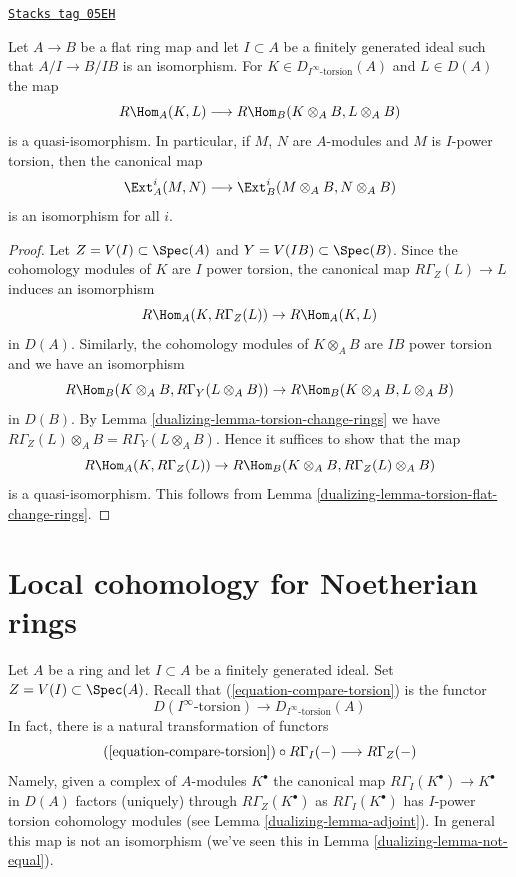 \begin{lemma}
\label{dualizing-lemma-neighbourhood-extensions}
\href{https://stacks.math.columbia.edu/tag/05EH}{\texttt{Stacks tag 05EH}}

Let $A \to B$ be a flat ring map and let $I \subset A$ be a
finitely generated ideal such that $A/I \to B/IB$ is an isomorphism.
For $K \in D_{I^\infty\text{-torsion}}(A)$ and $L \in D(A)$
the map
$$
R\Hom_A(K, L) \longrightarrow R\Hom_B(K \otimes_A B, L \otimes_A B)
$$
is a quasi-isomorphism. In particular, if $M$, $N$ are $A$-modules and
$M$ is $I$-power torsion, then the canonical map
$$
\Ext^i_A(M, N)
\longrightarrow
\Ext^i_B(M \otimes_A B, N \otimes_A B)
$$
is an isomorphism for all $i$.
\end{lemma}

\begin{proof}

Let $Z = V(I) \subset \Spec(A)$ and $Y = V(IB) \subset \Spec(B)$.
Since the cohomology modules of $K$ are $I$ power torsion, the
canonical map $R\Gamma_Z(L) \to L$ induces an isomorphism
$$
R\Hom_A(K, R\Gamma_Z(L)) \to R\Hom_A(K, L)
$$
in $D(A)$. Similarly, the cohomology modules of $K \otimes_A B$ are
$IB$ power torsion and we have an isomorphism
$$
R\Hom_B(K \otimes_A B, R\Gamma_Y(L \otimes_A B)) \to
R\Hom_B(K \otimes_A B, L \otimes_A B)
$$
in $D(B)$.
By Lemma \ref{dualizing-lemma-torsion-change-rings} we have
$R\Gamma_Z(L) \otimes_A B = R\Gamma_Y(L \otimes_A B)$.
Hence it suffices to show that the map
$$
R\Hom_A(K, R\Gamma_Z(L)) \to R\Hom_B(K \otimes_A B, R\Gamma_Z(L) \otimes_A B)
$$
is a quasi-isomorphism. This follows from
Lemma \ref{dualizing-lemma-torsion-flat-change-rings}.
\end{proof}

\section{Local cohomology for Noetherian rings}
\label{dualizing-section-local-cohomology-noetherian}
Let $A$ be a ring and let $I \subset A$ be a finitely generated ideal.
Set $Z = V(I) \subset \Spec(A)$. Recall that (\ref{equation-compare-torsion})
is the functor
$$
D(I^\infty\text{-torsion}) \to D_{I^\infty\text{-torsion}}(A)
$$
In fact, there is a natural transformation of functors
\begin{equation}
\label{equation-compare-torsion-functors}
(\ref{equation-compare-torsion}) \circ R\Gamma_I(-)
\longrightarrow
R\Gamma_Z(-)
\end{equation}
Namely, given a complex of $A$-modules $K^\bullet$ the canonical map
$R\Gamma_I(K^\bullet) \to K^\bullet$ in $D(A)$ factors (uniquely)
through $R\Gamma_Z(K^\bullet)$ as $R\Gamma_I(K^\bullet)$ has
$I$-power torsion cohomology modules (see Lemma \ref{dualizing-lemma-adjoint}).
In general this map is not an isomorphism (we've seen this in
Lemma \ref{dualizing-lemma-not-equal}).

